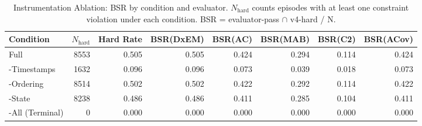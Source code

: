 \begin{table}[htbp]
\centering
\caption{Instrumentation Ablation: BSR by condition and evaluator. $N_{\text{hard}}$ counts episodes with at least one constraint violation under each condition. BSR = evaluator-pass $\cap$ v4-hard / N.}
\label{tab:instrumentation_ablation}
\begin{tabular}{lrrrrrrr}
\toprule
Condition & $N_{\text{hard}}$ & Hard Rate & BSR(DxEM) & BSR(AC) & BSR(MAB) & BSR(C2) & BSR(ACov) \\
\midrule
Full & 8553 & 0.505 & 0.505 & 0.424 & 0.294 & 0.114 & 0.424 \\
-Timestamps & 1632 & 0.096 & 0.096 & 0.073 & 0.039 & 0.018 & 0.073 \\
-Ordering & 8514 & 0.502 & 0.502 & 0.422 & 0.292 & 0.114 & 0.422 \\
-State & 8238 & 0.486 & 0.486 & 0.411 & 0.285 & 0.104 & 0.411 \\
-All (Terminal) & 0 & 0.000 & 0.000 & 0.000 & 0.000 & 0.000 & 0.000 \\
\bottomrule
\end{tabular}
\end{table}
